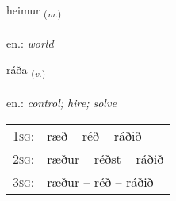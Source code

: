 \documentclass[frontgrid, backgrid]{flacards}\usepackage[]{graphicx}\usepackage[]{xcolor}
\begin{document}
\renewcommand{\flhead}{\vskip5pt \fboxsep=0pt {\small\bfseries\footnotesize Nafnorð | Noun}}
\renewcommand{\fcfoot}{\vskip5pt \fboxsep=0pt \hspace{2pt}{\small\bfseries\footnotesize 1K}}

\renewcommand{\blhead}{\vskip5pt {\small\bfseries\footnotesize Nafnorð | Noun }}
\renewcommand{\bcfoot}{\vskip5pt \hspace{2pt}{\small\bfseries\footnotesize 1K}}


{heimur \small{\textsubscript{(\textit{m.})}} \\[1ex] %
\textphonetic{[heiːmʏr]} \\
en.: \emph{world} \\  [2ex]
\renewcommand*{\arraystretch}{0.8}
}

\renewcommand{\flhead}{\vskip5pt \fboxsep=0pt {\small\bfseries\footnotesize Sagnorð | Verb}}
\renewcommand{\fcfoot}{\vskip5pt \fboxsep=0pt \hspace{2pt}{\small\bfseries\footnotesize 1K}}

\renewcommand{\blhead}{\vskip5pt {\small\bfseries\footnotesize Sagnorð | Verb }}
\renewcommand{\bcfoot}{\vskip5pt \hspace{2pt}{\small\bfseries\footnotesize 1K}}


{ráða \small{\textsubscript{(\textit{v.})}} \\[1ex] %
\textphonetic{[rauːða]} \\
en.: \emph{control; hire; solve} \\  [2ex]
\renewcommand*{\arraystretch}{0.8}
\begin{tabular}{p{1cm}l}
\textsc{1sg}: & ræð -- réð -- ráðið \\ 
\textsc{2sg}: & ræður -- réðst -- ráðið \\ 
\textsc{3sg}: & ræður -- réð -- ráðið \\ 
\end{tabular}
}
\end{document}

